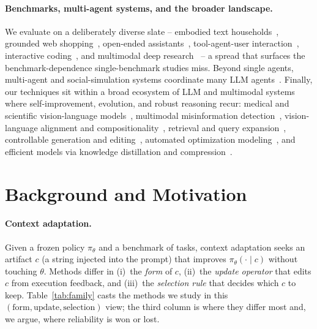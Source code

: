 \documentclass{article}
\begin{document}
\paragraph{Benchmarks, multi-agent systems, and the broader landscape.} We evaluate on
a deliberately diverse slate -- embodied text households~\citep{shridhar2021alfworld},
grounded web shopping~\citep{yao2022webshop}, open-ended assistants~\citep{mialon2023gaia},
tool-agent-user interaction~\citep{yao2024taubench}, interactive
coding~\citep{trivedi2024appworld}, and multimodal deep research~\citep{zeng2026vision}
-- a spread that surfaces the benchmark-dependence single-benchmark studies miss.
Beyond single agents, multi-agent and social-simulation systems coordinate many LLM
agents~\citep{zhang2025ga, zhang2026coupling}. Finally, our techniques sit within a
broad ecosystem of LLM and multimodal systems where self-improvement, evolution, and
robust reasoning recur: medical and scientific vision-language
models~\citep{zhu2025medeyes, wu2025bridging}, multimodal misinformation
detection~\citep{li2026s, li2025cmie}, vision-language alignment and
compositionality~\citep{Zhang_2024_CVPR, zhang2025assessing}, retrieval and query
expansion~\citep{zhang2024exploring, xie2025chat, xie2026hvd, xie2026conquer,
xie2026delving}, controllable generation and editing~\citep{xu2024headrouter},
automated optimization modeling~\citep{liu2026automated}, and efficient models via
knowledge distillation and compression~\citep{Lan_2025_ICCV, lan2026reco, Lan_2026_WACV}.

\section{Background and Motivation}
\label{sec:background}
\paragraph{Context adaptation.} Given a frozen policy $\pi_\theta$ and a benchmark of
tasks, context adaptation seeks an artifact $c$ (a string injected into the prompt)
that improves $\pi_\theta(\cdot\mid c)$ without touching $\theta$. Methods differ in
(i)~the \emph{form} of $c$, (ii)~the \emph{update operator} that edits $c$ from
execution feedback, and (iii)~the \emph{selection rule} that decides which $c$ to
keep. Table~\ref{tab:family} casts the methods we study in this $(\text{form},
\text{update}, \text{selection})$ view; the third column is where they differ most
and, we argue, where reliability is won or lost.
\end{document}
